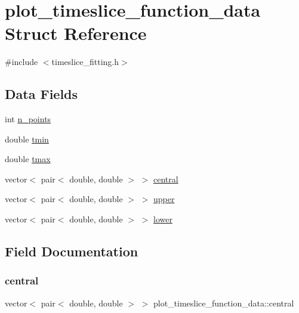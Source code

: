 \hypertarget{structplot__timeslice__function__data}{}\section{plot\+\_\+timeslice\+\_\+function\+\_\+data Struct Reference}
\label{structplot__timeslice__function__data}


{\ttfamily \#include $<$timeslice\+\_\+fitting.\+h$>$}

\subsection*{Data Fields}
\begin{DoxyCompactItemize}
\item 
int \mbox{\hyperlink{structplot__timeslice__function__data_a20074b84c823278b4a43a9fd238700c8}{n\+\_\+points}}
\item 
double \mbox{\hyperlink{structplot__timeslice__function__data_af133da61b7b7e153c824c5737c80c654}{tmin}}
\item 
double \mbox{\hyperlink{structplot__timeslice__function__data_a4ad3eeea0a22a5bb0c0d502ebb6027ed}{tmax}}
\item 
vector$<$ pair$<$ double, double $>$ $>$ \mbox{\hyperlink{structplot__timeslice__function__data_a1a1791f1b2c2472423304b117ce993a5}{central}}
\item 
vector$<$ pair$<$ double, double $>$ $>$ \mbox{\hyperlink{structplot__timeslice__function__data_abc2e47244a22d040be23aa17474d489e}{upper}}
\item 
vector$<$ pair$<$ double, double $>$ $>$ \mbox{\hyperlink{structplot__timeslice__function__data_a0c084622f3f6fbe24ce08cd590333ae9}{lower}}
\end{DoxyCompactItemize}


\subsection{Field Documentation}
\mbox{\label{structplot__timeslice__function__data_a1a1791f1b2c2472423304b117ce993a5}} 
\subsubsection{\texorpdfstring{central}{central}}
{\footnotesize\ttfamily vector$<$ pair$<$ double, double $>$ $>$ plot\+\_\+timeslice\+\_\+function\+\_\+data\+::central}

